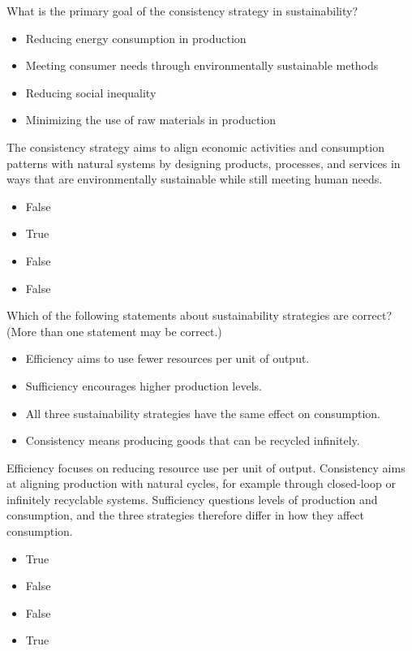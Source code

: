 \documentclass[
  a4paper,
  DIV=11,
  numbers=noendperiod,
  oneside,
  openany]{scrreprt}
\providecommand{\tightlist}{%
  \setlength{\itemsep}{0pt}\setlength{\parskip}{0pt}}
\begin{document}
What is the primary goal of the consistency strategy in sustainability?

\begin{itemize}
\tightlist
\item[$\square$]
  Reducing energy consumption in production
\item[$\square$]
  Meeting consumer needs through environmentally sustainable methods
\item[$\square$]
  Reducing social inequality
\item[$\square$]
  Minimizing the use of raw materials in production
\end{itemize}

The consistency strategy aims to align economic activities and
consumption patterns with natural systems by designing products,
processes, and services in ways that are environmentally sustainable
while still meeting human needs.

\begin{itemize}
\tightlist
\item
  False
\item
  True
\item
  False
\item
  False
\end{itemize}

Which of the following statements about sustainability strategies are
correct? (More than one statement may be correct.)

\begin{itemize}
\tightlist
\item[$\square$]
  Efficiency aims to use fewer resources per unit of output.
\item[$\square$]
  Sufficiency encourages higher production levels.
\item[$\square$]
  All three sustainability strategies have the same effect on
  consumption.
\item[$\square$]
  Consistency means producing goods that can be recycled infinitely.
\end{itemize}

Efficiency focuses on reducing resource use per unit of output.
Consistency aims at aligning production with natural cycles, for example
through closed-loop or infinitely recyclable systems. Sufficiency
questions levels of production and consumption, and the three strategies
therefore differ in how they affect consumption.

\begin{itemize}
\tightlist
\item
  True
\item
  False
\item
  False
\item
  True
\end{itemize}
\end{document}
